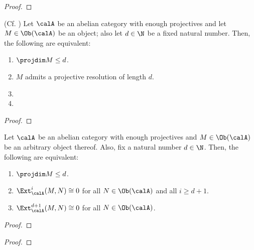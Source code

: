                 \begin{proof}
                    
                \end{proof}
            \begin{proposition}
                (Cf. \cite[\href{https://stacks.math.columbia.edu/tag/0CXC}{Tag 0CXC}]{stacks}) Let $\calA$ be an abelian category with enough projectives and let $M \in \Ob(\calA)$ be an object; also let $d \in \N$ be a fixed natural number. Then, the following are equivalent:
                    \begin{enumerate}
                        \item $\projdim M \leq d$.
                        \item $M$ admits a projective resolution of length $d$.
                        \item 
                        \item 
                    \end{enumerate}
            \end{proposition}
                \begin{proof}
                    
                \end{proof}
            \begin{proposition} \label{prop: computing_projective_dimensions_using_Ext}
                Let $\calA$ be an abelian category with enough projectives and $M \in \Ob(\calA)$ be an arbitrary object thereof. Also, fix a natural number $d \in \N$. Then, the following are equivalent:
                    \begin{enumerate}
                        \item $\projdim M \leq d$.
                        \item $\Ext_{\calA}^i(M, N) \cong 0$ for all $N \in \Ob(\calA)$ and all $i \geq d + 1$.
                        \item $\Ext_{\calA}^{d + 1}(M, N) \cong 0$ for all $N \in \Ob(\calA)$.
                    \end{enumerate}
            \end{proposition}
                \begin{proof}
                    
                \end{proof}
            \begin{proposition} \label{prop: projective_dimensions_and_short_exact_sequences}
                
            \end{proposition}
                \begin{proof}
                    
                \end{proof}
                
